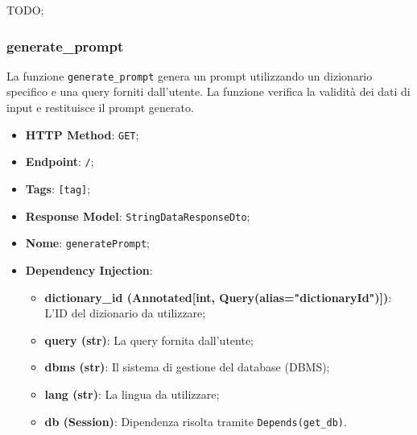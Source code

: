 \par TODO;


\subsubsection{generate\_prompt}

\par La funzione \texttt{generate\_prompt} genera un prompt utilizzando un dizionario specifico e una query forniti dall'utente. La funzione verifica la validità dei dati di input e restituisce il prompt generato.

\begin{itemize}
 \item \textbf{HTTP Method}: \texttt{GET};
 \item \textbf{Endpoint}: \texttt{/};
 \item \textbf{Tags}: \texttt{[tag]};
 \item \textbf{Response Model}: \texttt{StringDataResponseDto};
 \item \textbf{Nome}: \texttt{generatePrompt};
 \item \textbf{Dependency Injection}:
  \begin{itemize}
    \item \textbf{dictionary\_id (Annotated[int, Query(alias="dictionaryId")])}: L'ID del dizionario da utilizzare;
    \item \textbf{query (str)}: La query fornita dall'utente;
    \item \textbf{dbms (str)}: Il sistema di gestione del database (DBMS);
    \item \textbf{lang (str)}: La lingua da utilizzare;
    \item \textbf{db (Session)}: Dipendenza risolta tramite \texttt{Depends(get\_db)}.
  \end{itemize}
\end{itemize}

